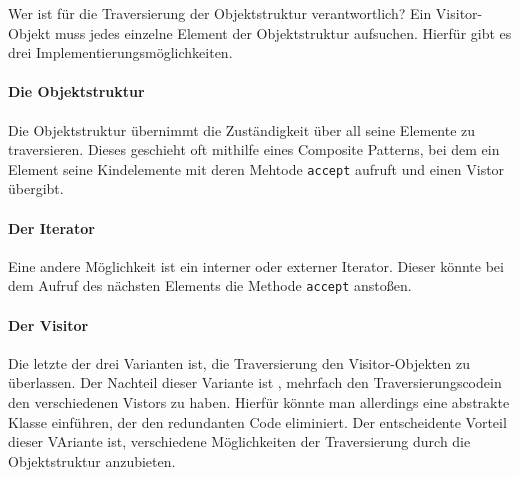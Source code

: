 
Wer ist für die Traversierung der  Objektstruktur verantwortlich? Ein Visitor-Objekt muss jedes einzelne Element der Objektstruktur aufsuchen. Hierfür gibt es drei Implementierungsmöglichkeiten. 
\paragraph{Die Objektstruktur} Die Objektstruktur übernimmt die Zuständigkeit über all seine Elemente zu traversieren. Dieses geschieht oft mithilfe eines Composite Patterns, bei dem ein Element seine Kindelemente mit deren Mehtode \texttt{accept} aufruft und einen Vistor übergibt.
\paragraph{Der Iterator} Eine andere Möglichkeit ist ein interner oder externer Iterator. Dieser könnte bei dem Aufruf des nächsten Elements die Methode \texttt{accept} anstoßen.
\paragraph{Der Visitor} Die letzte der drei Varianten ist, die Traversierung den Visitor-Objekten zu überlassen. Der Nachteil dieser Variante ist , mehrfach den Traversierungscodein den verschiedenen Vistors zu haben. Hierfür könnte man allerdings eine abstrakte Klasse einführen, der den redundanten Code eliminiert. Der entscheidente Vorteil dieser VAriante ist, verschiedene Möglichkeiten der Traversierung durch die Objektstruktur anzubieten.



